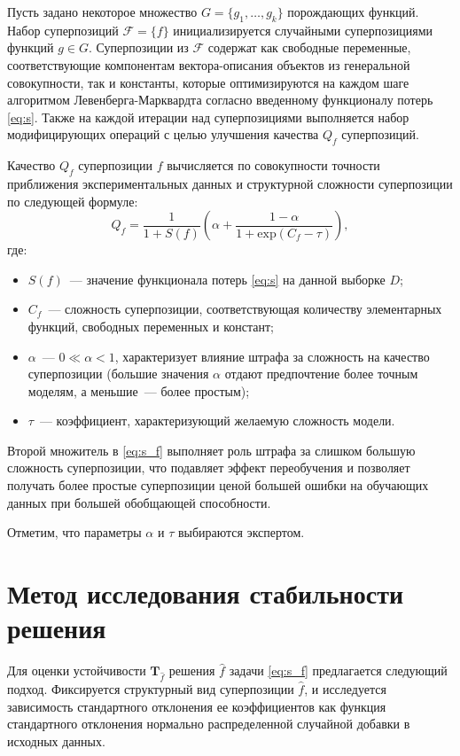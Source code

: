 \documentclass[12pt,a4paper]{article}
\begin{document}
Пусть задано некоторое множество $G = \{ g_1, \dots, g_k \}$ 
порождающих функций. Набор суперпозиций $\mathcal{F} = \{ f \}$
инициализируется случайными суперпозициями функций $g \in G$. Суперпозиции из
$\mathcal{F}$ содержат как свободные переменные, соответствующие
компонентам вектора-описания объектов из генеральной совокупности, так и
константы, которые оптимизируются на каждом шаге алгоритмом Левенберга-Марквардта
согласно введенному функционалу потерь \eqref{eq:s}. Также на каждой итерации
над суперпозициями выполняется набор модифицирующих операций с целью улучшения
качества $Q_f$ суперпозиций.

Качество $Q_f$ суперпозиции $f$ вычисляется по совокупности точности приближения
экспериментальных данных и структурной сложности суперпозиции по следующей формуле:
\begin{equation}
  Q_f = \frac{1}{1 + S(f)} \left(\alpha + \frac{1 - \alpha}{1 + \text{exp} (C_f - \tau)}\right),
  \label{eq:s_f}
\end{equation}
где:
\begin{itemize}
  \item[] $S(f)$~--- значение функционала потерь \eqref{eq:s} на данной выборке $D$;
  \item[] $C_f$~--- сложность суперпозиции, соответствующая количеству элементарных
	функций, свободных переменных и констант;
  \item[] $\alpha$~--- $0 \ll \alpha < 1$, характеризует влияние штрафа за сложность
	на качество суперпозиции (большие значения $\alpha$ отдают предпочтение более
	точным моделям, а меньшие~--- более простым);
  \item[] $\tau$~--- коэффициент, характеризующий желаемую сложность модели.
\end{itemize}

Второй множитель в \eqref{eq:s_f} выполняет роль штрафа за слишком
большую сложность суперпозиции, что подавляет эффект переобучения и позволяет
получать более простые суперпозиции ценой большей ошибки на обучающих данных
при большей обобщающей способности.

Отметим, что параметры $\alpha$ и $\tau$ выбираются экспертом.

\section{Метод исследования стабильности решения}

Для оценки устойчивости $\mathbf{T}_{\hat{f}}$ решения $\hat{f}$ задачи
\eqref{eq:s_f} предлагается следующий подход. Фиксируется структурный вид суперпозиции
$\hat{f}$, и исследуется зависимость стандартного отклонения ее коэффициентов
как функция стандартного отклонения нормально распределенной случайной добавки
в исходных данных.
\end{document}
